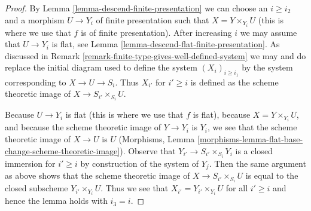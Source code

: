 \documentclass[10pt,a4paper]{amsart}
\theoremstyle{plain}
\theoremstyle{definition}
\theoremstyle{remark}
\numberwithin{equation}{subsection}
\begin{document}
\begin{proof}
By Lemma \ref{lemma-descend-finite-presentation}
we can choose an $i \geq i_2$ and a morphism
$U \to Y_i$ of finite presentation such that $X = Y \times_{Y_i} U$
(this is where we use that $f$ is of finite presentation).
After increasing $i$ we may assume that $U \to Y_i$ is flat, see
Lemma \ref{lemma-descend-flat-finite-presentation}.
As discussed in Remark \ref{remark-finite-type-gives-well-defined-system}
we may and do replace the initial diagram used to define the system
$(X_i)_{i \geq i_1}$ by the system corresponding to
$X \to U \to S_i$. Thus $X_{i'}$ for $i' \geq i$ is defined as
the scheme theoretic image of $X \to S_{i'} \times_{S_i} U$.

\medskip\noindent
Because $U \to Y_i$ is flat (this is where we use that $f$ is flat),
because $X = Y \times_{Y_i} U$, and
because the scheme theoretic image of $Y \to Y_i$ is $Y_i$,
we see that the scheme theoretic image of $X \to U$ is $U$
(Morphisms, Lemma
\ref{morphisms-lemma-flat-base-change-scheme-theoretic-image}).
Observe that $Y_{i'} \to S_{i'} \times_{S_i} Y_i$ is a closed
immersion for $i' \geq i$ by construction of the system of $Y_j$.
Then the same argument as above shows that the scheme theoretic image
of $X \to S_{i'} \times_{S_i} U$
is equal to the closed subscheme $Y_{i'} \times_{Y_i} U$.
Thus we see that $X_{i'} = Y_{i'} \times_{Y_i} U$ for all $i' \geq i$
and hence the lemma holds with $i_3 = i$.
\end{proof}
\end{document}
